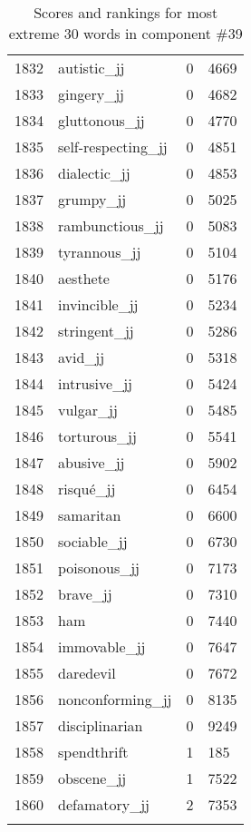 \begin{longtable}[!htbp]{| rlr@{.}l |}
    1832 & autistic\_jj & 0 & 4669 \\
    1833 & gingery\_jj & 0 & 4682 \\
    1834 & gluttonous\_jj & 0 & 4770 \\
    1835 & self-respecting\_jj & 0 & 4851 \\
    1836 & dialectic\_jj & 0 & 4853 \\
    1837 & grumpy\_jj & 0 & 5025 \\
    1838 & rambunctious\_jj & 0 & 5083 \\
    1839 & tyrannous\_jj & 0 & 5104 \\
    1840 & aesthete & 0 & 5176 \\
    1841 & invincible\_jj & 0 & 5234 \\
    1842 & stringent\_jj & 0 & 5286 \\
    1843 & avid\_jj & 0 & 5318 \\
    1844 & intrusive\_jj & 0 & 5424 \\
    1845 & vulgar\_jj & 0 & 5485 \\
    1846 & torturous\_jj & 0 & 5541 \\
    1847 & abusive\_jj & 0 & 5902 \\
    1848 & risqué\_jj & 0 & 6454 \\
    1849 & samaritan & 0 & 6600 \\
    1850 & sociable\_jj & 0 & 6730 \\
    1851 & poisonous\_jj & 0 & 7173 \\
    1852 & brave\_jj & 0 & 7310 \\
    1853 & ham & 0 & 7440 \\
    1854 & immovable\_jj & 0 & 7647 \\
    1855 & daredevil & 0 & 7672 \\
    1856 & nonconforming\_jj & 0 & 8135 \\
    1857 & disciplinarian & 0 & 9249 \\
    1858 & spendthrift & 1 & 185 \\
    1859 & obscene\_jj & 1 & 7522 \\
    1860 & defamatory\_jj & 2 & 7353 \\
    \hline
    \caption{Scores and rankings for most extreme 30 words in component \#39} \\
\end{longtable}
